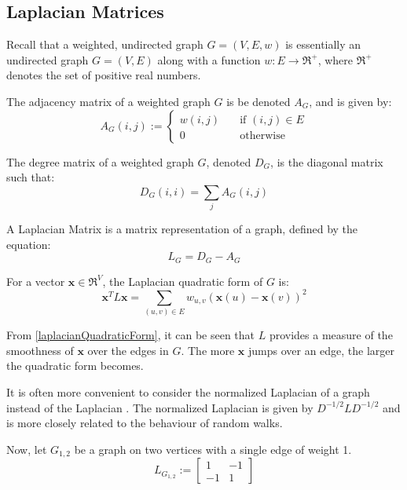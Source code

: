 \subsection{Laplacian Matrices}
\label{laplacianMatrices}
\nocite{Berkeley:1999,Pati:2011,Spielman:2006}
Recall that a weighted, undirected graph $G = (V,E,w)$ is essentially an
undirected graph $G = (V,E)$ along with a function $w : E \rightarrow \Re^+$,
where $\Re^+$ denotes the set of positive real numbers.

The adjacency matrix of a weighted graph $G$ is be denoted $A_G$, and is given
by:
\begin{equation}
    A_{G}(i,j) :=
        \left\{
            \begin{array}{ll}
                \mathit{w}(i,j) &   \quad \text{if $(i,j) \in E$}\\
                0 &                 \quad \text{otherwise}
            \end{array}
        \right.
\end{equation}

The degree matrix of a weighted graph $G$, denoted $D_G$, is the diagonal matrix
such that:
\begin{equation}
    D_G(i,i) = \sum_j A_G(i,j)
\end{equation}

A Laplacian Matrix is a matrix representation of a graph, defined by the
equation:
\begin{equation}
    L_G = D_G - A_G
\end{equation}

For a vector $\textbf{x} \in \Re^V$, the Laplacian quadratic form of $G$ is:
\begin{equation}
    \label{laplacianQuadraticForm}
    \textbf{x}^T L \textbf{x} = \sum_{(u,v) \in E} w_{u,v}(\textbf{x}(u) - \textbf{x}(v))^2
\end{equation}

From \autoref{laplacianQuadraticForm}, it can be seen that $L$ provides a
measure of the smoothness of $\textbf{x}$ over the edges in $G$. The more
$\textbf{x}$ jumps over an edge, the larger the quadratic form becomes.

It is often more convenient to consider the normalized Laplacian of a graph
instead of the Laplacian \cite{Spielman:2010}. The normalized Laplacian is given
by $D^{-1/2}LD^{-1/2}$ and is more closely related to the behaviour of random
walks.

Now, let $G_{1,2}$ be a graph on two vertices with a single edge of weight 1.
\begin{equation}
    L_{G_{1,2}} :=
        \begin{bmatrix}
            1 & -1\\
            -1 & 1
        \end{bmatrix}
\end{equation}

